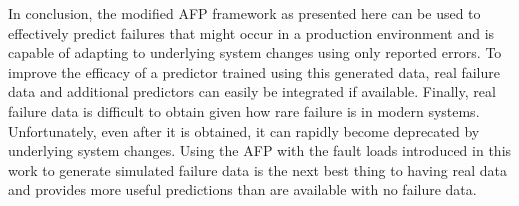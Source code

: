 In conclusion, the modified \ac{AFP} framework as presented here can be used to
effectively predict failures that might occur in a production environment and
is capable of adapting to underlying system changes using only reported errors.
To improve the efficacy of a predictor trained using this generated data, real
failure data and additional predictors can easily be integrated if available.
Finally, real failure data is difficult to obtain given how rare failure is in
modern systems.  Unfortunately, even after it is obtained, it can rapidly
become deprecated by underlying system changes.  Using the \ac{AFP} with the
fault loads introduced in this work to generate simulated failure data is the
next best thing to having real data and provides more useful predictions than
are available with no failure data.
